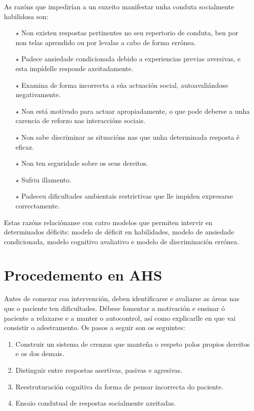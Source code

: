 \documentclass[a4paper,11pt]{article}
\begin{document}
As razóns que impedirían a un suxeito manifestar unha conduta socialmente habilidosa son:
\begin{itemize}
	\item[$\star$] Non existen respostas pertinentes no seu repertorio de conduta, ben por non telas 
	aprendido ou por levalas a cabo de forma errónea.
	\item[$\star$] Padece ansiedade condicionada debido a experiencias previas aversivas, e esta 
	impídelle responde axeitadamente.
	\item[$\star$] Examina de forma incorrecta a súa actuación social, autoavaliándose negativamente.
	\item[$\star$] Non está motivado para actuar apropiadamente, o que pode deberse a unha carencia 
	de reforzo nas interaccións sociais.
	\item[$\star$] Non sabe discriminar as situacións nas que unha determinada resposta é eficaz.
	\item[$\star$] Non ten seguridade sobre os seus dereitos.
	\item[$\star$] Sufriu illamento.
	\item[$\star$] Padeceu dificultades ambientais restrictivas que lle impiden expresarse
	correctamente. 
\end{itemize}

Estas razóns relaciónanse con catro modelos que permiten intervir en determinados déficits: modelo de déficit en habilidades, modelo de ansiedade condicionada, modelo cognitivo avaliativo e modelo de discriminación errónea. 

\section{Procedemento en AHS}
Antes de comezar coa intervención, deben identificarse e avaliarse as áreas nas que o paciente ten dificultades. Débese fomentar a motivación e ensinar ó paciente a relaxarse e a manter o autocontrol, así como explicarlle en que vai consistir o adestramento. Os pasos a seguir son os seguintes:
\begin{enumerate}
	\item Construir un sistema de crenzas que manteña o respeto polos propios dereitos e os dos 
	demais. 
	\item Distinguir entre respostas asertivas, pasivas e agresivas.
	\item Reestruturación cognitiva da forma de pensar incorrecta do paciente.
	\item Ensaio condutual de respostas socialmente axeitadas.
\end{enumerate}
\end{document}
